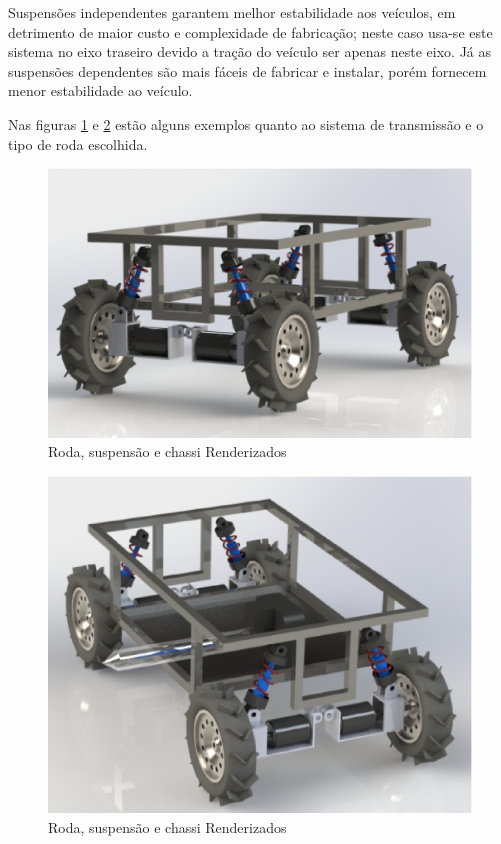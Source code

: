   Suspensões independentes garantem melhor estabilidade aos veículos, em detrimento de maior custo e complexidade de fabricação; neste caso usa-se este sistema no eixo traseiro devido a tração do veículo ser apenas neste eixo. Já as suspensões dependentes são mais fáceis de fabricar e instalar, porém fornecem menor estabilidade ao veículo.

  Nas figuras \ref{SUSPENTION01} e \ref{SUSPENTION02} estão alguns exemplos quanto ao sistema de transmissão e o tipo de roda escolhida.

  \vfill

  \begin{figure}[!htbp]
  	\begin{center}
  		\includegraphics[keepaspectratio=true,scale=0.5]{figuras/suspention01.eps}
  		\caption{\label{SUSPENTION01}Roda, suspensão e chassi Renderizados}
  	\end{center}
  \end{figure}

  \begin{figure}[!htbp]
  	\begin{center}
  		\includegraphics[keepaspectratio=true,scale=0.5]{figuras/suspention02.eps}
  		\caption{\label{SUSPENTION02}Roda, suspensão e chassi Renderizados}
  	\end{center}
  \end{figure}

